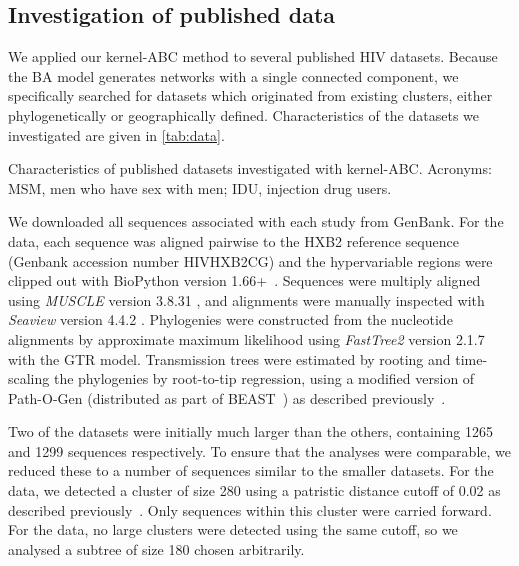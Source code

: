 \documentclass[12pt]{article}\usepackage[]{graphicx}\usepackage[]{color}
\newcommand{\software}[1]{\textit{#1}}
\newcommand{\tablepath}{../tables}
\begin{document}
\subsection*{Investigation of published data}

We applied our kernel-ABC method to several published HIV datasets. Because the
\gls{BA} model generates networks with a single connected component, we
specifically searched for datasets which originated from existing clusters,
either phylogenetically or geographically defined. Characteristics of the
datasets we investigated are given in \cref{tab:data}.

\begin{table}[ht]
  \centering
  
  \caption{Characteristics of published datasets investigated with kernel-ABC.
  Acronyms: MSM, men who have sex with men; IDU, injection drug users.}
  \label{tab:data}
\end{table}

We downloaded all sequences associated with each study from GenBank. For the
\textcite{novitsky2014impact} data, each sequence was aligned pairwise to the
HXB2 reference sequence (Genbank accession number HIVHXB2CG) and the
hypervariable regions were clipped out with BioPython version
1.66+~\autocite{cock2009biopython}. Sequences were multiply aligned using
\software{MUSCLE} version 3.8.31 \autocite{edgar2004muscle}, and alignments
were manually inspected with \software{Seaview} version 4.4.2
\autocite{gouy2010seaview}. Phylogenies were constructed from the nucleotide
alignments by approximate maximum likelihood using \software{FastTree2} version
2.1.7 with the \gls{GTR} model. Transmission trees were estimated by rooting
and time-scaling the phylogenies by root-to-tip regression, using a modified
version of Path-O-Gen (distributed as part of
BEAST~\autocite{drummond2007beast}) as described
previously~\autocite{poon2015phylodynamic}. 

Two of the datasets \autocite{li2015hiv,novitsky2014impact} were initially much
larger than the others, containing 1265 and 1299 sequences respectively. To
ensure that the analyses were comparable, we reduced these to a number of
sequences similar to the smaller datasets. For the \textcite{li2015hiv} data,
we detected a cluster of size 280 using a patristic distance cutoff of 0.02 as
described previously~\autocite{poon2014impact}. Only sequences within this
cluster were carried forward. For the \textcite{novitsky2014impact} data, no
large clusters were detected using the same cutoff, so we analysed a subtree of
size 180 chosen arbitrarily.
\end{document}
